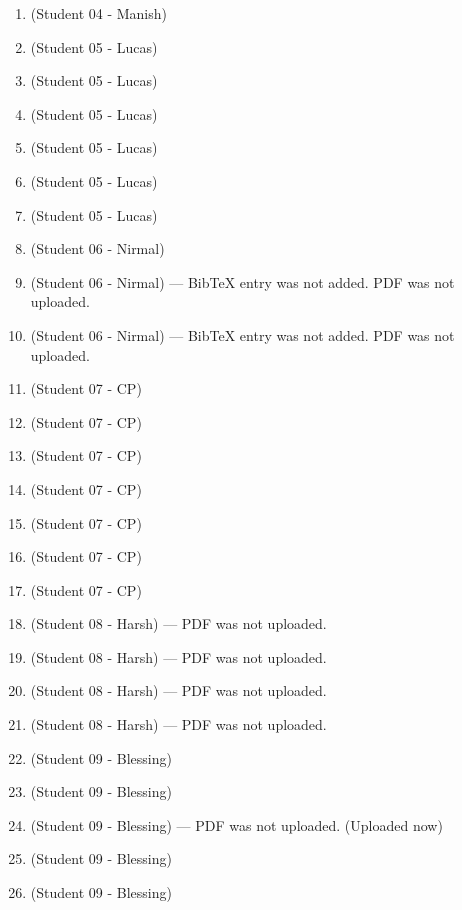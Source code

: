 \documentclass{article}
\begin{document}
\begin{enumerate}[label=\#\arabic*,noitemsep,nolistsep]
\item \cite{petriu1993environment} (Student 04 - Manish)
\item \cite{morita1988reconstruction} (Student 05 - Lucas)
\item \cite{kiyasu1995measurement} (Student 05 - Lucas)
\item \cite{dehnhardt1988universal} (Student 05 - Lucas)
\item \cite{ali1989pseudorandom} (Student 05 - Lucas)
\item \cite{jia2011construction} (Student 05 - Lucas)
\item \cite{ozturk1996generation} (Student 05 - Lucas)
\item \cite{grubman2016partitioning} (Student 06 - Nirmal)
\item \cite{li2014class} (Student 06 - Nirmal) --- BibTeX entry was not added. PDF was not uploaded.
\item \cite{muggli2017succinct} (Student 06 - Nirmal) --- BibTeX entry was not added. PDF was not uploaded.
\item \cite{zach2025puzzlepoles} (Student 07 - CP)
\item \cite{schmid2022determining} (Student 07 - CP)
\item \cite{etzion2011sequence} (Student 07 - CP)
\item \cite{fang2015one} (Student 07 - CP)
\item \cite{spoelder1998some} (Student 07 - CP)
\item \cite{goubin2004construction} (Student 07 - CP)
\item \cite{marcovich2023zero} (Student 07 - CP)
\item \cite{morita1988two} (Student 08 - Harsh) --- PDF was not uploaded.
\item \cite{etzion2007tilings} (Student 08 - Harsh) --- PDF was not uploaded.
\item \cite{vuylsteke1990range} (Student 08 - Harsh) --- PDF was not uploaded.
\item \cite{bomer1990perfect} (Student 08 - Harsh) --- PDF was not uploaded.
\item \cite{paterson1994perfect} (Student 09 - Blessing)
\item \cite{ulusoy2009one} (Student 09 - Blessing)
\item \cite{fredricksen1992new} (Student 09 - Blessing) --- PDF was not uploaded. (Uploaded now)
\item \cite{chee2024bruijn} (Student 09 - Blessing)
\item \cite{blackburn2026bruijn} (Student 09 - Blessing)

\end{enumerate}
\end{document}
